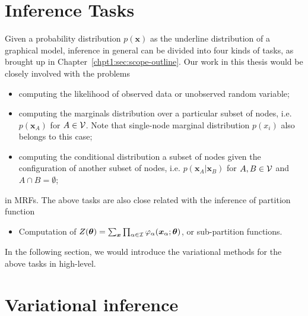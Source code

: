 \section{Inference Tasks}


Given a probability distribution $p(\bm{x})$ as the underline distribution of a graphical model, inference in general can be divided into four kinds of tasks, as brought up in Chapter~\ref{chpt1:sec:scope-outline}. Our work in this thesis would be closely involved with the problems
\begin{itemize}
\item computing the likelihood of observed data or unobserved random variable;
\item computing the marginals distribution over a particular subset of nodes, i.e. $p(\bm{x}_A)$ for $A \in \mathcal{V}$. Note that single-node marginal distribution $p(x_i)$ also belongs to this case;
\item computing the conditional distribution a subset of nodes given the configuration of another subset of nodes, i.e. $p(\bm{x}_A| \bm{x}_B)$ for $A, B \in \mathcal{V}$ and $A \cap B = \emptyset$;
\end{itemize}
in MRFs. The above tasks are also close related with the inference of partition function
\begin{itemize}
\item Computation of $Z(\bm{\theta}) = \sum_{\bm{x}} \prod_{\alpha \in \mathcal{I}} \varphi_{\alpha}(\bm{x}_{\alpha};\bm{\theta})$, or sub-partition functions.
\end{itemize}

In the following section, we would introduce the variational methods for the above tasks in high-level.


\section{Variational inference}


